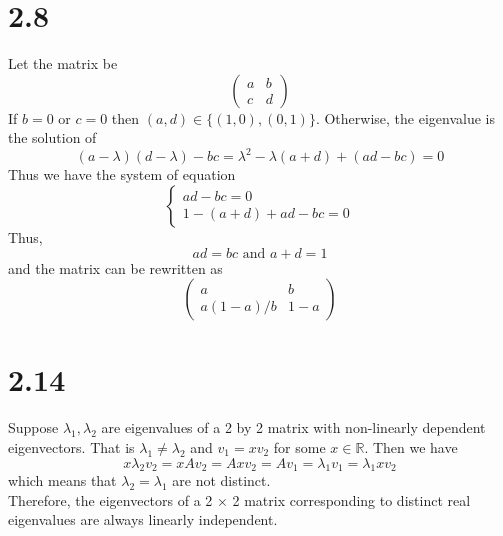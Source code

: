 \documentclass[11pt]{article}
\theoremstyle{mystyle}
\theoremstyle{definition}
\begin{document}
\section*{2.8}
Let the matrix be 
\[
  \begin{pmatrix}
    a & b \\
    c & d
  \end{pmatrix}
\]
If $b = 0$ or $c=0$ then $(a,d) \in \{(1,0), (0,1)\}$.
Otherwise, the eigenvalue is the solution of 
\[
  (a - \lambda)(d-\lambda) - bc = \lambda^2 - \lambda(a + d) + (ad-bc) = 0 
\]
Thus we have the system of equation 
\[
  \begin{cases}
    ad - bc = 0 \\
    1 - (a+d) + ad - bc = 0
  \end{cases}
\]
Thus, 
\[
  ad = bc \text{ and } a + d = 1
\]
and the matrix can be rewritten as  
\[
  \begin{pmatrix}
    a & b \\
    a(1-a)/b & 1-a
  \end{pmatrix}
\]
\pagebreak
\section*{2.14}
Suppose $\lambda_1, \lambda_2$ are eigenvalues of a 2 by 2 matrix with non-linearly dependent eigenvectors. That is 
$\lambda_1 \ne \lambda_2$ and $v_1 = x v_2$ for some $x \in \mathbb{R}$. Then we have 
\[
  x \lambda_2 v_2 =  x A v_2 = Ax v_2 = A v_1 = \lambda_1 v_1 = \lambda_1 x v_2 
\]
which means that $\lambda_2 = \lambda_1$ are not distinct. \\
Therefore, the eigenvectors of a 2 × 2 matrix corresponding to distinct real eigenvalues are always linearly independent.
\end{document}
